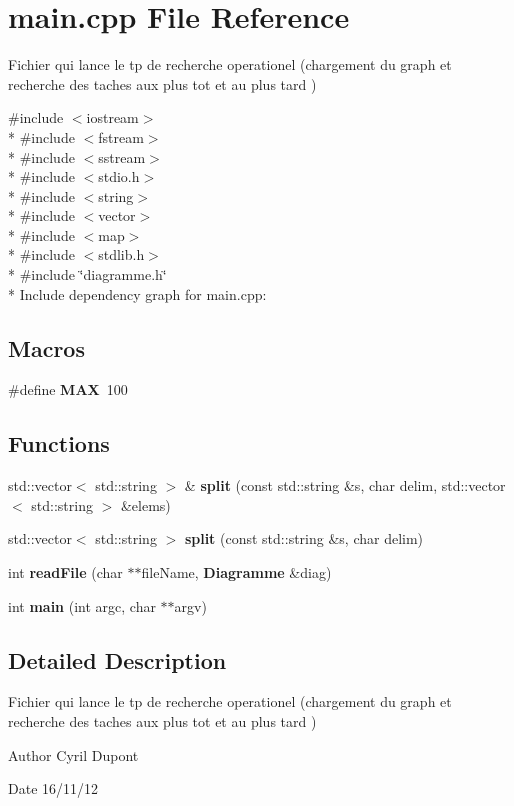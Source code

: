 \section{main.\-cpp File Reference}
\label{main_8cpp}


Fichier qui lance le tp de recherche operationel (chargement du graph et recherche des taches aux plus tot et au plus tard )  


{\ttfamily \#include $<$iostream$>$}\\*
{\ttfamily \#include $<$fstream$>$}\\*
{\ttfamily \#include $<$sstream$>$}\\*
{\ttfamily \#include $<$stdio.\-h$>$}\\*
{\ttfamily \#include $<$string$>$}\\*
{\ttfamily \#include $<$vector$>$}\\*
{\ttfamily \#include $<$map$>$}\\*
{\ttfamily \#include $<$stdlib.\-h$>$}\\*
{\ttfamily \#include \char`\"{}diagramme.\-h\char`\"{}}\\*
Include dependency graph for main.\-cpp\-:
\subsection*{Macros}
\begin{DoxyCompactItemize}
\item 
\#define {\bfseries M\-A\-X}~100\label{main_8cpp_a392fb874e547e582e9c66a08a1f23326}

\end{DoxyCompactItemize}
\subsection*{Functions}
\begin{DoxyCompactItemize}
\item 
std\-::vector$<$ std\-::string $>$ \& {\bfseries split} (const std\-::string \&s, char delim, std\-::vector$<$ std\-::string $>$ \&elems)\label{main_8cpp_a7e8c005cbce86b3a6b65bcfb106b2825}

\item 
std\-::vector$<$ std\-::string $>$ {\bfseries split} (const std\-::string \&s, char delim)\label{main_8cpp_ae924c9b43cd7b086945003c09c294d2b}

\item 
int {\bfseries read\-File} (char $\ast$$\ast$file\-Name, {\bf Diagramme} \&diag)\label{main_8cpp_acf76bf5a1f86c516f41cead0e49f408e}

\item 
int {\bfseries main} (int argc, char $\ast$$\ast$argv)\label{main_8cpp_a3c04138a5bfe5d72780bb7e82a18e627}

\end{DoxyCompactItemize}


\subsection{Detailed Description}
Fichier qui lance le tp de recherche operationel (chargement du graph et recherche des taches aux plus tot et au plus tard ) \begin{DoxyAuthor}{Author}
Cyril Dupont 
\end{DoxyAuthor}
\begin{DoxyDate}{Date}
16/11/12 
\end{DoxyDate}
